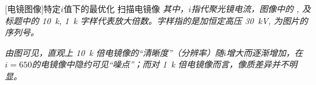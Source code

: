 \documentclass[aps,pre,12pt,preprint,%
	onecolumn,showpacs,showkeys,nofootinbib]{revtex4-1}
\begin{document}
\begin{minipage}{\linewidth}
\begin{minipage}[c]{.6\linewidth}
	\end{minipage}
	\begin{minipage}[c]{.3\linewidth}
	[电镜图像]{特定$i$值下的最优化%
		扫描电镜像}
	\textit{\hphantom{说明}%
		其中，$i$指代聚光镜电流，图像中的 ,  及标题中的 \SI{10}{k}, \SI{1}{k} 字样代表放大倍数。字样指的是加恒定高压 \SI{30}{\kV}, 为图片的序列号。
	\vspace{1ex}}\par
	\textit{\hphantom{分析}%
		由图可见，直观上 \SI{10}{k} 倍电镜像的“清晰度”（分辨率）随$i$增大而逐渐增加，在$i = 650$的电镜像中隐约可见“噪点”；而对 \SI{1}{k} 倍电镜像而言，像质差异并不明显。
	\vspace{1ex}}
	\label{fig:photoOriginal}
	\end{minipage}
	\end{minipage}
\restoregeometry
\FloatBarrier
\end{document}
